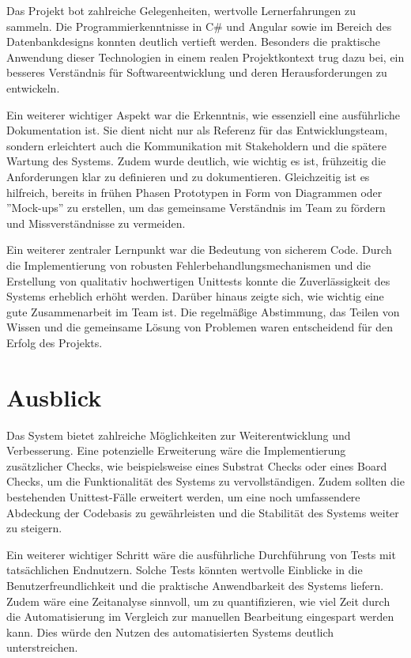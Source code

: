 Das Projekt bot zahlreiche Gelegenheiten, wertvolle Lernerfahrungen zu sammeln. Die Programmierkenntnisse in C\# und Angular sowie im Bereich des Datenbankdesigns konnten deutlich vertieft werden. Besonders die praktische Anwendung dieser Technologien in einem realen Projektkontext trug dazu bei, ein besseres Verständnis für Softwareentwicklung und deren Herausforderungen zu entwickeln.

Ein weiterer wichtiger Aspekt war die Erkenntnis, wie essenziell eine ausführliche Dokumentation ist. Sie dient nicht nur als Referenz für das Entwicklungsteam, sondern erleichtert auch die Kommunikation mit Stakeholdern und die spätere Wartung des Systems. Zudem wurde deutlich, wie wichtig es ist, frühzeitig die Anforderungen klar zu definieren und zu dokumentieren. Gleichzeitig ist es hilfreich, bereits in frühen Phasen Prototypen in Form von Diagrammen oder ''Mock-ups'' zu erstellen, um das gemeinsame Verständnis im Team zu fördern und Missverständnisse zu vermeiden.

Ein weiterer zentraler Lernpunkt war die Bedeutung von sicherem Code. Durch die Implementierung von robusten Fehlerbehandlungsmechanismen und die Erstellung von qualitativ hochwertigen Unittests konnte die Zuverlässigkeit des Systems erheblich erhöht werden.  Darüber hinaus zeigte sich, wie wichtig eine gute Zusammenarbeit im Team ist. Die regelmäßige Abstimmung, das Teilen von Wissen und die gemeinsame Lösung von Problemen waren entscheidend für den Erfolg des Projekts.

\section{Ausblick}

Das System bietet zahlreiche Möglichkeiten zur Weiterentwicklung und Verbesserung. Eine potenzielle Erweiterung wäre die Implementierung zusätzlicher Checks, wie beispielsweise eines Substrat Checks oder eines Board Checks, um die Funktionalität des Systems zu vervollständigen. Zudem sollten die bestehenden Unittest-Fälle erweitert werden, um eine noch umfassendere Abdeckung der Codebasis zu gewährleisten und die Stabilität des Systems weiter zu steigern.

Ein weiterer wichtiger Schritt wäre die ausführliche Durchführung von Tests mit tatsächlichen Endnutzern. Solche Tests könnten wertvolle Einblicke in die Benutzerfreundlichkeit und die praktische Anwendbarkeit des Systems liefern. Zudem wäre eine Zeitanalyse sinnvoll, um zu quantifizieren, wie viel Zeit durch die Automatisierung im Vergleich zur manuellen Bearbeitung eingespart werden kann. Dies würde den Nutzen des automatisierten Systems deutlich unterstreichen.

